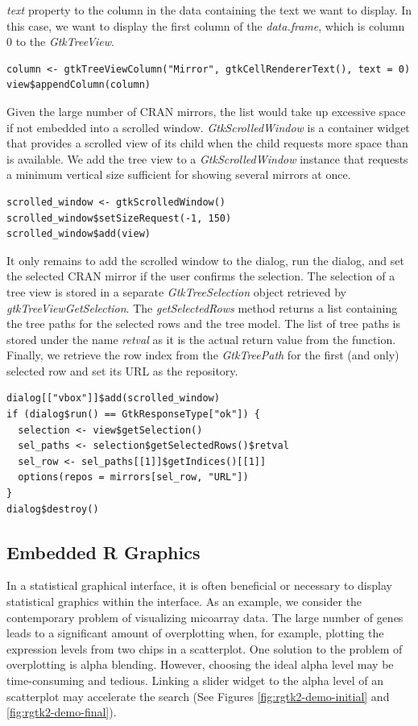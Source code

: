 \documentclass[article]{jss}
\begin{document}
\emph{text}
property to the column in the data containing the text we want to
display.
In this case, we want to display the first column of the
\emph{data.frame},
which is column $0$ to the \emph{GtkTreeView}.
\begin{verbatim}
column <- gtkTreeViewColumn("Mirror", gtkCellRendererText(), text = 0)
view$appendColumn(column)
\end{verbatim}
Given the large number of CRAN mirrors, the list would take up
excessive space
if not embedded into a scrolled window. \emph{GtkScrolledWindow} is a
container 
widget that provides a scrolled view of its child when the child
requests more
space than is available. We add the tree view to a
\emph{GtkScrolledWindow} 
instance that requests a minimum vertical size sufficient for showing
several 
mirrors at once.
\begin{verbatim}
scrolled_window <- gtkScrolledWindow()
scrolled_window$setSizeRequest(-1, 150)
scrolled_window$add(view)
\end{verbatim}
It only remains to add the scrolled window to the dialog, run the
dialog, and
set the selected CRAN mirror if the user confirms the selection. The
selection
of a tree view is stored in a separate \emph{GtkTreeSelection} object
retrieved
by \emph{gtkTreeViewGetSelection}. The \emph{getSelectedRows} method
returns a 
list containing the tree paths for the selected rows and the tree
model. The 
list of tree paths is stored under the name \emph{retval} as it is the
actual
return value from the  function. Finally, we retrieve the
row index
from the \emph{GtkTreePath} for the first (and only) selected row and
set its 
URL as the repository.
\begin{verbatim}
dialog[["vbox"]]$add(scrolled_window)
if (dialog$run() == GtkResponseType["ok"]) {
  selection <- view$getSelection()
  sel_paths <- selection$getSelectedRows()$retval
  sel_row <- sel_paths[[1]]$getIndices()[[1]]
  options(repos = mirrors[sel_row, "URL"])
}
dialog$destroy()
\end{verbatim}

\subsection{Embedded R Graphics}\label{sec:embedded-graphics}

In a statistical graphical interface, it is often beneficial or
necessary to display statistical graphics within the interface. As
an example, we consider the contemporary problem of visualizing
micoarray data. The large number of genes leads to a significant
amount of overplotting when, for example, plotting the expression
levels from two chips in a scatterplot. One solution to the problem of
overplotting is alpha blending. However, choosing the ideal alpha
level may be time-consuming and tedious. Linking a slider widget to
the alpha level of an  scatterplot may accelerate the
search (See Figures \ref{fig:rgtk2-demo-initial} and
\ref{fig:rgtk2-demo-final}).
\end{document}

